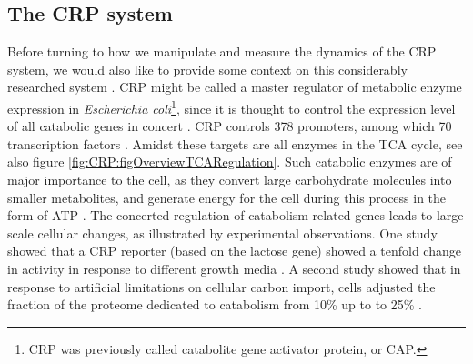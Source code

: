\subsection{The CRP system}

Before turning to how we manipulate and measure the dynamics of the CRP system, 
we would also like to provide some context on this considerably researched system \cite{Keseler2017, Fic2009, Deutscher2008, Gorke2008}.
%
%
CRP might be called a master regulator of metabolic enzyme expression in \textit{Escherichia coli}\footnote{CRP was previously called catabolite gene activator protein, or CAP.}, since
%
it is thought to %
control the expression level of all catabolic genes in concert \cite{You2013, Hui2015, Kochanowski2017}.
%
CRP controls 378 promoters, among which 70 transcription factors \cite{Green2014, Shimada2011, Grainger2005, Zheng2004}.
%
Amidst these targets are all enzymes in the TCA cycle, see also figure \ref{fig:CRP:figOverviewTCARegulation}.
%
Such catabolic enzymes 
are of major importance to the cell, 
as they
convert large carbohydrate molecules into smaller metabolites, and generate energy for the cell during this process in the form of ATP \cite{Nelson2005}.
%
The concerted regulation of catabolism related genes leads to large scale cellular changes, as illustrated by experimental observations.
One study showed that a CRP reporter (based on the lactose gene) showed a tenfold change in activity in response to different growth media \cite{You2013}.
A second study showed that in response to artificial limitations on cellular carbon import, 
cells adjusted the fraction of the proteome dedicated to catabolism from 10\% up to to 25\% \cite{Hui2015}.


